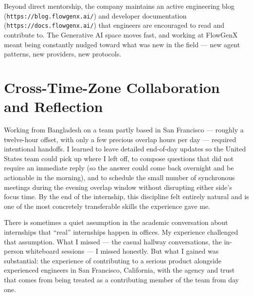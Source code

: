 Beyond direct mentorship, the company maintains an active engineering
blog (\texttt{https://blog.flowgenx.ai/}) and developer documentation
(\texttt{https://docs.flowgenx.ai/}) that engineers are encouraged to
read and contribute to. The Generative AI space moves fast, and
working at FlowGenX meant being constantly nudged toward what was new
in the field --- new agent patterns, new providers, new protocols.

\section{Cross-Time-Zone Collaboration and Reflection}
Working from Bangladesh on a team partly based in San Francisco ---
roughly a twelve-hour offset, with only a few precious overlap hours
per day --- required intentional handoffs. I learned to leave
detailed end-of-day updates so the United States team could pick up
where I left off, to compose questions that did not require an
immediate reply (so the answer could come back overnight and be
actionable in the morning), and to schedule the small number of
synchronous meetings during the evening overlap window without
disrupting either side's focus time. By the end of the internship,
this discipline felt entirely natural and is one of the most
concretely transferable skills the experience gave me.

There is sometimes a quiet assumption in the academic conversation
about internships that ``real'' internships happen in offices. My
experience challenged that assumption. What I missed --- the casual
hallway conversations, the in-person whiteboard sessions --- I missed
honestly. But what I gained was substantial: the experience of
contributing to a serious product alongside experienced engineers in
San Francisco, California, with the agency and trust that comes from
being treated as a contributing member of the team from day one.
